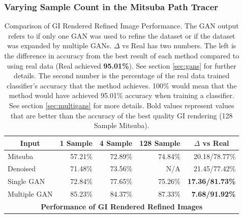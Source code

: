 \documentclass[10pt,twocolumn,letterpaper]{article}
\begin{document}
\subsubsection{Varying Sample Count in the Mitsuba Path Tracer}
\begin{table}[]
\centering

\begin{tabular}{|l|r|r|r|r|}
\hline
\multicolumn{1}{|c|}{\textbf{Input}} & \multicolumn{1}{c|}{\textbf{1 Sample}} & \multicolumn{1}{c|}{\textbf{4 Sample}} & \multicolumn{1}{c|}{\textbf{128 Sample}} & \multicolumn{1}{c|}{\textbf{$\Delta$ vs Real}} \\ \hline
Mitsuba& 57.21\%                                & 72.89\%                                 & 74.84\%                                   & 20.18/78.77\%                               \\
Denoised& 71.48\%                                & 73.56\%                                 & N/A                                       & 21.45/77.42\%                                \\
Single GAN& 72.84\%                                & 77.65\%                                 & 75.26\%                                   & \textbf{17.36/81.73\%}                            \\
Multiple GAN& 85.23\%                                   & 84.37\%                                 & 87.33\%                                   & \textbf{7.68/91.92\%}                            \\ \hline
\multicolumn{5}{|c|}{\textbf{Performance of GI Rendered Refined Images}}                                                                                                                                             \\ \hline
\end{tabular}
\caption{Comparison of GI Rendered Refined Image Performance. The GAN output refers to if only one GAN was used to refine the dataset or if the dataset was expanded by multiple GANs. $\Delta$ vs Real has two numbers. The left is the difference in accuracy from the best result of each method compared to using real data (Real achieved \textbf{95.01\%}). See section \ref{sec:gans} for further details.  The second number is the percentage of the real data trained classifier's accuracy that the method achieves.  100\% would mean that the method would have achieved 95.01\% accuracy when training a classifier. See section \ref{sec:multigans} for more details. Bold values represent values that are better than the accuracy of the best quality GI rendering (128 Sample Mitsuba).}
\label{tblallrefined}
\end{table}
\end{document}
